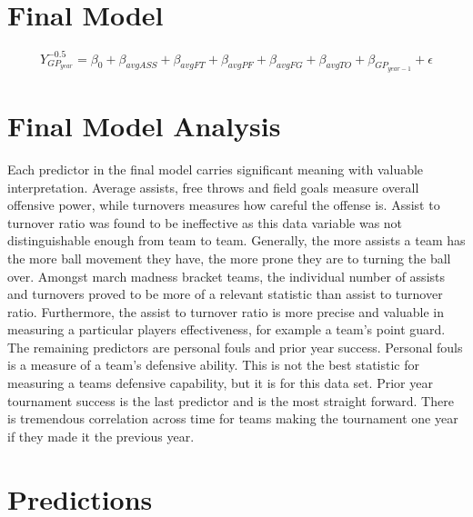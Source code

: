 \documentclass[]{scrartcl}
\begin{document}
\section*{Final Model}
	\[
Y_{GP_{year}}^{-0.5} = \beta_0 + \beta_{avgASS} +\beta_{avgFT} + \beta_{avgPF} + \beta_{avgFG} + \beta_{avgTO} + \beta_{GP_{year-1}}+ \epsilon 
\]
\section*{Final Model Analysis}
Each predictor in the final model carries significant meaning with valuable interpretation. Average assists, free throws and field goals measure overall offensive power, while turnovers measures how careful the offense is. Assist to turnover ratio was found to be ineffective as this data variable was not distinguishable enough from team to team. Generally, the more assists a team has the more ball movement they have, the more prone they are to turning the ball over. Amongst march madness bracket teams, the individual number of assists and turnovers proved to be more of a relevant statistic than assist to turnover ratio. Furthermore, the assist to turnover ratio is more precise and valuable in measuring a particular players effectiveness, for example a team's point guard. The remaining predictors are personal fouls and prior year success. Personal fouls is a measure of a team's defensive ability. This is not the best statistic for measuring a teams defensive capability, but it is for this data set. Prior year tournament success is the last predictor and is the most straight forward. There is tremendous correlation across time for teams making the tournament one year if they made it the previous year.   
\section*{Predictions}
\end{document}

